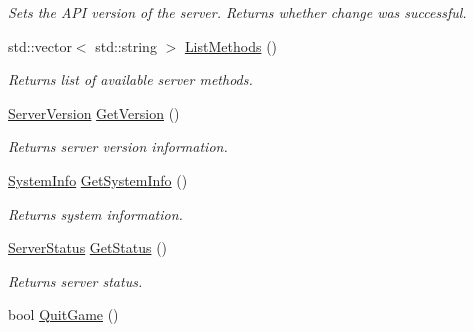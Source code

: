\begin{DoxyCompactItemize}
\begin{DoxyCompactList}\small\item\em Sets the A\-P\-I version of the server. Returns whether change was successful. \end{DoxyCompactList}\item 
std\-::vector$<$ std\-::string $>$ \hyperlink{classMethods_a7833782aa64f9072db30809552f83eef}{List\-Methods} ()
\begin{DoxyCompactList}\small\item\em Returns list of available server methods. \end{DoxyCompactList}\item 
\hyperlink{structServerVersion}{Server\-Version} \hyperlink{classMethods_a674b7c1f53296dca78fb14896b374e1e}{Get\-Version} ()
\begin{DoxyCompactList}\small\item\em Returns server version information. \end{DoxyCompactList}\item 
\hyperlink{structSystemInfo}{System\-Info} \hyperlink{classMethods_a0030583fdad06ab0f2f589b79c904f09}{Get\-System\-Info} ()
\begin{DoxyCompactList}\small\item\em Returns system information. \end{DoxyCompactList}\item 
\hyperlink{structServerStatus}{Server\-Status} \hyperlink{classMethods_af39e05685756a82b5991a2fc25d5e941}{Get\-Status} ()
\begin{DoxyCompactList}\small\item\em Returns server status. \end{DoxyCompactList}\item 
\hypertarget{classMethods_aee11e205500b7ad449c025c8e3e4b11b}{bool \hyperlink{classMethods_aee11e205500b7ad449c025c8e3e4b11b}{Quit\-Game} ()}\label{classMethods_aee11e205500b7ad449c025c8e3e4b11b}


\end{DoxyCompactItemize}
